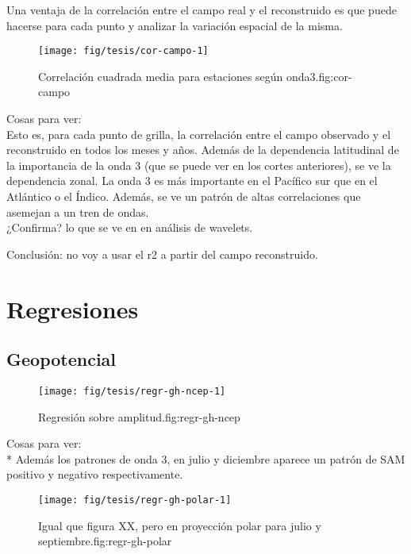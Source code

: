 \documentclass[spanish,a4paper]{book}
\begin{document}
Una ventaja de la correlación entre el campo real y el reconstruido es
que puede hacerse para cada punto y analizar la variación espacial de la
misma.

\begin{figure}
\texttt{[image: fig/tesis/cor-campo-1]} \caption{Correlación cuadrada media para estaciones según onda3.{fig:cor-campo}}\label{fig:cor-campo}
\end{figure}

Cosas para ver:\\
Esto es, para cada punto de grilla, la correlación entre el campo
observado y el reconstruido en todos los meses y años. Además de la
dependencia latitudinal de la importancia de la onda 3 (que se puede ver
en los cortes anteriores), se ve la dependencia zonal. La onda 3 es más
importante en el Pacífico sur que en el Atlántico o el Índico. Además,
se ve un patrón de altas correlaciones que asemejan a un tren de
ondas.\\
¿Confirma? lo que se ve en en análisis de wavelets.

Conclusión: no voy a usar el r2 a partir del campo reconstruido.

\section{Regresiones}\label{regresiones}

\subsection{Geopotencial}\label{geopotencial}

\begin{figure}

{\centering \texttt{[image: fig/tesis/regr-gh-ncep-1]} 

}

\caption{Regresión sobre amplitud.{fig:regr-gh-ncep}}\label{fig:regr-gh-ncep}
\end{figure}

Cosas para ver:\\
* Además los patrones de onda 3, en julio y diciembre aparece un patrón
de SAM positivo y negativo respectivamente.

\begin{figure}
\texttt{[image: fig/tesis/regr-gh-polar-1]} \caption{Igual que figura  XX, pero en proyección polar para julio y septiembre.{fig:regr-gh-polar}}\label{fig:regr-gh-polar}
\end{figure}
\end{document}
